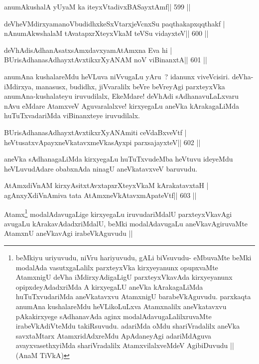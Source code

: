 

\begin{shl}
anumAkushalA yUyaM ka iteyxVtadivxBASayxtAmf\hfill || 599 ||
\end{shl}

\begin{shl}
deVheVMdirxyamanoVbudidhxkeSxVtarxjeVcnxSu paqthakapxqqthakf |
nAnumAkwshalaM tAvatapxrXteyxVkaM teVSu vidayxteV\hfill || 600 ||
\end{shl}

\begin{shl}
deVhAdisAdhanAsatxsAmxdavxyamAtAmxna Eva hi |
BUrisAdhanasAdhayxtAvxtikxrXyANAM noV viBinanxtA\hfill || 601 ||
\end{shl}

\begin{artha}
anumAna kushalareMdu heVLuva niVvugaLu yAru~? idanunx viveVcisiri. deVha-iMdirxya, manasusx, budidhx, jiVvaralilx beVre beVreyAgi parxteyxVka anumAna-kushalateyu iruvudilalx, EkeMdare! deVhAdi sAdhanavuLaLxvaru nAvu eMdare AtamxveV Aguvaralalxve! kirxyegaLu aneVka kArakagaLiMda huTuTxvadariMda viBinanxteye iruvudilalx.
\end{artha}

\begin{shl}
BUrisAdhanasAdhayxtAvxtikxrXyANAmiti ceVdaBxveVtf |
heVtusatxvApayxneVkatavxmeVkasAyxpi parxsajayxteV\hfill || 602 ||
\end{shl}

\begin{artha}
aneVka sAdhanagaLiMda kirxyegaLu huTuTxvudeMba heVtuvu ideyeMdu heVLuvudAdare obabxnAda ninagU aneVkatavxveV baruvudu.
\end{artha}



\begin{shl}
AtAmxdiVnAM kirxyAsitxtAvxtapxrXteyxVkaM kArakatavxtaH |
agAnxyXdiVnAmiva tata AtAmxneVkAtavxmApateVtf\hfill || 603 ||
\end{shl}

\begin{artha}
Atamx\footnote[1]{beMkiyu uriyuvudu, niVru hariyuvudu, gALi biVsuvudu-
  eMbuvaMte beMki modalAda vasutxgaLalilx parxteyxVka kirxyeyanunx
  opupxvaMte AtamxnigU deVha iMdirxyAdigaLigU parxteyxVkavAda
  kirxyeyanunx opipxdeyAdadxriMda A kirxyegaLU aneVka kArakagaLiMda
  huTuTxvudariMda aneVkatavxvu AtamxnigU barabeVkAguvudu. parxkaqta
  anumAna kushalareMdu heVLikoLuLxva Atamxnalilx aneVkatavxvu
  pAkakirxyege sAdhanavAda aginx modalAdavugaLalilxruvaMte
  irabeVkAdiVteMdu takiRsuvudu. adariMda oMdu shariVradalilx aneVka
  savxtaMtarx AtamxridAdxreMdu ApAdaneyAgi adariMdAguva
  avayxvasethxyiMda shariVradalilx AtamxvilalxveMdeV AgibiDuvudu || 
  (AnaM TiVkA)} modalAdavugaLige kirxyegaLu iruvudariMdalU
parxteyxVkavAgi avugaLu kArakavAdadxriMdalU, beMki modalAdavugaLu
aneVkavAgiruvaMte AtamxnU aneVkavAgi irabeVkAguvudu ||
\end{artha}


